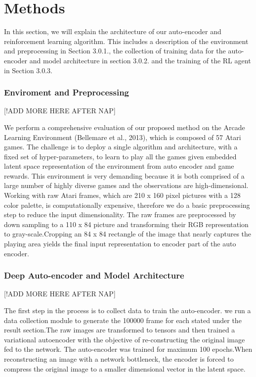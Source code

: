 \chapter{Methods }

In this section, we will explain the architecture of our auto-encoder and reinforcement learning algorithm. This includes a description of the environment and preprocessing  in Section 3.0.1., the collection of training data for the auto-encoder and model architecture in section 3.0.2. and the training of the RL agent in Section  3.0.3.


\subsection{Enviroment and Preprocessing}
[!ADD MORE HERE AFTER NAP]

We perform a comprehensive evaluation of our proposed method on the Arcade Learning Environment (Bellemare et al., 2013), which is composed of 57 Atari games. The challenge is to deploy a single algorithm and architecture, with a fixed set of hyper-parameters, to learn to play all the games given embedded latent space representation of the environment from auto encoder and game rewards. This environment is very demanding because it is both comprised of a large number of highly diverse games and the observations are high-dimensional.\\

Working with raw Atari frames, which are 210 x 160 pixel pictures with a 128 color palette, is computationally expensive, therefore we do a basic preprocessing step to reduce the input dimensionality. The raw frames are preprocessed by down sampling to a 110 x 84 picture and transforming their RGB representation to gray-scale.Cropping an 84 x 84 rectangle of the image that nearly captures the playing area yields the final input representation to encoder part of the auto encoder.


\subsection{Deep Auto-encoder and Model Architecture}
[!ADD MORE HERE AFTER NAP]

The first step in the process is to collect data to train the auto-encoder. we run a data collection module to generate the 100000 frame for each stated under the result section.The raw images are transformed to tensors and then trained a variational autoencoder with the objective of re-constructing the original image fed to the network. The auto-encoder was trained for maximum  100 epochs.When reconstructing an image with a network bottleneck, the encoder is forced to compress the original image to a smaller dimensional vector in the latent space.

